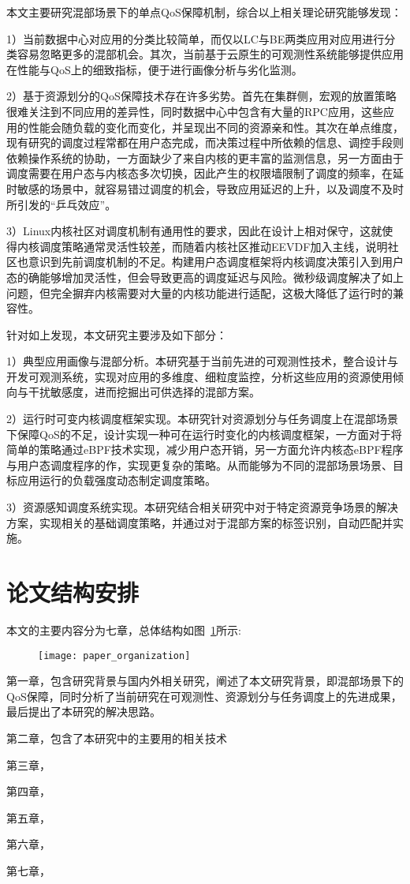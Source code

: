 本文主要研究混部场景下的单点QoS保障机制，综合以上相关理论研究能够发现：

1）当前数据中心对应用的分类比较简单，而仅以LC与BE两类应用对应用进行分类容易忽略更多的混部机会。其次，当前基于云原生的可观测性系统能够提供应用在性能与QoS上的细致指标，便于进行画像分析与劣化监测。

2）基于资源划分的QoS保障技术存在许多劣势。首先在集群侧，宏观的放置策略很难关注到不同应用的差异性，同时数据中心中包含有大量的RPC应用，这些应用的性能会随负载的变化而变化，并呈现出不同的资源亲和性。其次在单点维度，现有研究的调度过程常都在用户态完成，而决策过程中所依赖的信息、调控手段则依赖操作系统的协助，一方面缺少了来自内核的更丰富的监测信息，另一方面由于调度需要在用户态与内核态多次切换，因此产生的权限墙限制了调度的频率，在延时敏感的场景中，就容易错过调度的机会，导致应用延迟的上升，以及调度不及时所引发的“乒乓效应”。

3）Linux内核社区对调度机制有通用性的要求，因此在设计上相对保守，这就使得内核调度策略通常灵活性较差，而随着内核社区推动EEVDF加入主线，说明社区也意识到先前调度机制的不足。构建用户态调度框架将内核调度决策引入到用户态的确能够增加灵活性，但会导致更高的调度延迟与风险。微秒级调度解决了如上问题，但完全摒弃内核需要对大量的内核功能进行适配，这极大降低了运行时的兼容性。

针对如上发现，本文研究主要涉及如下部分：

1）典型应用画像与混部分析。本研究基于当前先进的可观测性技术，整合设计与开发可观测系统，实现对应用的多维度、细粒度监控，分析这些应用的资源使用倾向与干扰敏感度，进而挖掘出可供选择的混部方案。

2）运行时可变内核调度框架实现。本研究针对资源划分与任务调度上在混部场景下保障QoS的不足，设计实现一种可在运行时变化的内核调度框架，一方面对于将简单的策略通过eBPF技术实现，减少用户态开销，另一方面允许内核态eBPF程序与用户态调度程序的作，实现更复杂的策略。从而能够为不同的混部场景场景、目标应用运行的负载强度动态制定调度策略。

3）资源感知调度系统实现。本研究结合相关研究中对于特定资源竞争场景的解决方案，实现相关的基础调度策略，并通过对于混部方案的标签识别，自动匹配并实施。

\section{论文结构安排}

本文的主要内容分为七章，总体结构如图~\ref{fig:paper_organization}所示:

\begin{figure}[!htbp]
    \centering
    \texttt{[image: paper\_organization]}
    \label{fig:paper_organization}
\end{figure}

第一章，包含研究背景与国内外相关研究，阐述了本文研究背景，即混部场景下的QoS保障，同时分析了当前研究在可观测性、资源划分与任务调度上的先进成果，最后提出了本研究的解决思路。

第二章，包含了本研究中的主要用的相关技术

第三章，

第四章，

第五章，

第六章，

第七章，